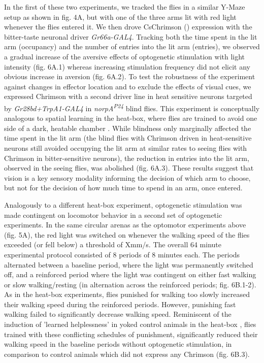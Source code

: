 \documentclass[10pt]{article}
\begin{document}
\begin{multicols}{2}
In the first of these two experiments, we tracked the flies in a similar Y-Maze setup as shown in fig. 4A, but with one of the three arms lit with red light whenever the flies entered it. We then drove CsChrimson (\cite{griebel_2014,Klapoetke_Independent_2014}) expression with the bitter-taste neuronal driver \textit{Gr66a-GAL4}. Tracking both the time spent in the lit arm (occupancy) and the number of entries into the lit arm (entries), we observed a gradual increase of the aversive effects of optogenetic stimulation with light intensity (fig. 6A.1) whereas increasing stimulation frequency did not elicit any obvious increase in aversion (fig. 6A.2). To test the robustness of the experiment against changes in effector location and to exclude the effects of visual cues, we expressed Chrimson with a second driver line in heat sensitive neurons targeted by \textit{Gr28bd+TrpA1-GAL4} in \textit{norpA\textsuperscript{P24}} blind flies. This experiment is conceptually analogous to spatial learning in the heat-box, where flies are trained to avoid one side of a dark, heatable chamber \cite{wustmann_rein_wolf_heisenberg_1996,wustmann_heisenberg_1997,diegelmann_2006,ostrowski_kahsai_kramer_knutson_zars_2015,putz_2002,sitaraman_zars_zars_2007,sitaraman_zars_zars_2010,zars_zars_2006}. While blindness only marginally affected the time spent in the lit arm (the blind flies with Chrimson driven in heat-sensitive neurons still avoided occupying the lit arm at similar rates to seeing flies with Chrimson in bitter-sensitive neurons), the reduction in entries into the lit arm, observed in the seeing flies, was abolished (fig. 6A.3). These results suggest that vision is a key sensory modality informing the decision of which arm to choose, but not for the decision of how much time to spend in an arm, once entered.

Analogously to a different heat-box experiment\cite{YANG2013799}, optogenetic stimulation was  made contingent on locomotor behavior in a second set of optogenetic experiments. In the same circular arenas as the optomotor experiments above (fig. 5A), the red light was switched on whenever the walking speed of the flies exceeded (or fell below) a threshold of Xmm/s. The overall 64 minute experimental protocol consisted of 8 periods of 8 minutes each. The periods alternated between a baseline period, where the light was permanently switched off, and a reinforced period where the light was contingent on either fast walking or slow walking/resting (in alternation across the reinforced periods; fig. 6B.1-2). As in the heat-box experiments, flies punished for walking too slowly increased their walking speed during the reinforced periods. However, punishing fast walking failed to significantly decrease walking speed. Reminiscent of the induction of 'learned helplessness' in yoked control animals in the heat-box \cite{YANG2013799}, flies trained with these conflicting schedules of punishment, significantly reduced their walking speed in the baseline periods without optogenetic stimulation, in comparison to control animals which did not express any Chrimson (fig. 6B.3).



\end{multicols}
\end{document}
